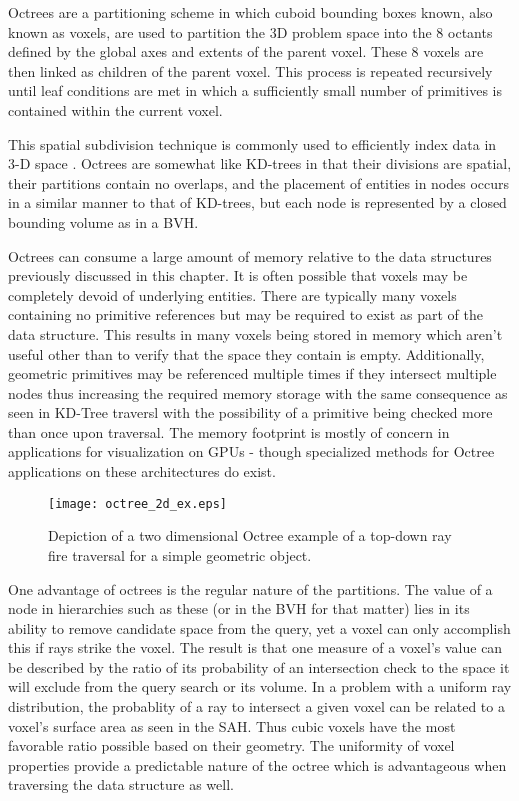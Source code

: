 Octrees are a partitioning scheme in which cuboid bounding boxes known, also
known as voxels, are used to partition the 3D problem space into the 8 octants
defined by the global axes and extents of the parent voxel. These 8 voxels are
then linked as children of the parent voxel. This process is repeated
recursively until leaf conditions are met in which a sufficiently small number
of primitives is contained within the current voxel.

This spatial subdivision technique is commonly used to efficiently index
data in 3-D space \cite{Glassner_1989}. Octrees are somewhat like KD-trees in
that their divisions are spatial, their partitions contain no overlaps, and the
placement of entities in nodes occurs in a similar manner to that of KD-trees,
but each node is represented by a closed bounding volume as in a BVH.

Octrees can consume a large amount of memory relative to the data
structures previously discussed in this chapter. It is often possible that
voxels may be completely devoid of underlying entities. There are typically many
voxels containing no primitive references but may be required to exist as part
of the data structure. This results in many voxels being stored in memory which
aren't useful other than to verify that the space they contain is
empty. Additionally, geometric primitives may be referenced multiple times if
they intersect multiple nodes thus increasing the required memory storage with
the same consequence as seen in KD-Tree traversl with the possibility of a
primitive being checked more than once upon traversal. The memory footprint is
mostly of concern in applications for visualization on GPUs - though specialized methods for Octree applications on these architectures do exist.

\begin{figure}[H]
  \centering
  \texttt{[image: octree\_2d\_ex.eps]}
  \caption{Depiction of a two dimensional Octree example of a top-down ray fire traversal for a simple geometric object.}
  \label{fig:2D_octree}
\end{figure}

One advantage of octrees is the regular nature of the partitions. The value of a
node in hierarchies such as these (or in the BVH for that matter) lies in its
ability to remove candidate space from the query, yet a voxel can only
accomplish this if rays strike the voxel. The result is that one measure of a
voxel's value can be described by the ratio of its probability of an
intersection check to the space it will exclude from the query search or its
volume. In a problem with a uniform ray distribution, the probablity of a ray to
intersect a given voxel can be related to a voxel's surface area as seen in the
SAH. Thus cubic voxels have the most favorable ratio possible based on their
geometry. The uniformity of voxel properties provide a predictable nature of the
octree which is advantageous when traversing the data structure as well.

